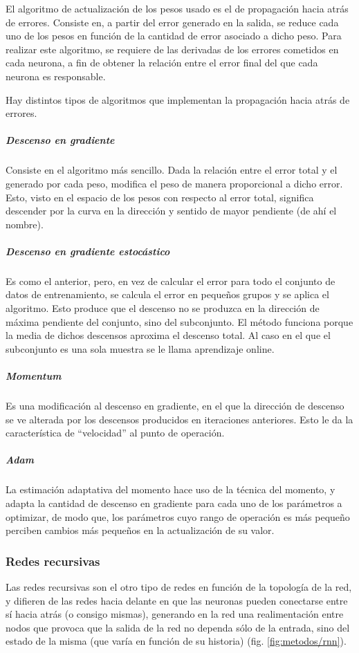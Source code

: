 El algoritmo de actualización de los pesos usado es el de propagación hacia atrás de errores. Consiste en, a partir del error generado en la salida, se reduce cada uno de los pesos en función de la cantidad de error asociado a dicho peso. Para realizar este algoritmo, se requiere de las derivadas de los errores cometidos en cada neurona, a fin de obtener la relación entre el error final del que cada neurona es responsable.

Hay distintos tipos de algoritmos \cite{gradient_descent} que implementan la propagación hacia atrás de errores.

\subparagraph{Descenso en gradiente}
Consiste en el algoritmo más sencillo. Dada la relación entre el error total y el generado por cada peso, modifica el peso de manera proporcional a dicho error. Esto, visto en el espacio de los pesos con respecto al error total, significa descender por la curva en la dirección y sentido de mayor pendiente (de ahí el nombre).
\subparagraph{Descenso en gradiente estocástico}
Es como el anterior, pero, en vez de calcular el error para todo el conjunto de datos de entrenamiento, se calcula el error en pequeños grupos y se aplica el algoritmo. Esto produce que el descenso no se produzca en la dirección de máxima pendiente del conjunto, sino del subconjunto. El método funciona porque la media de dichos descensos aproxima el descenso total. Al caso en el que el subconjunto es una sola muestra se le llama aprendizaje online.
\subparagraph{Momentum}
Es una modificación al descenso en gradiente, en el que la dirección de descenso se ve alterada por los descensos producidos en iteraciones anteriores. Esto le da la característica de ``velocidad'' al punto de operación.
\subparagraph{Adam}
La estimación adaptativa del momento hace uso de la técnica del momento, y adapta la cantidad de descenso en gradiente para cada uno de los parámetros a optimizar, de modo que, los parámetros cuyo rango de operación es más pequeño perciben cambios más pequeños en la actualización de su valor.

\subsubsection{Redes recursivas}
\label{subsubsec:metodos/recursivas}
Las redes recursivas \cite{karpathy} son el otro tipo de redes en función de la topología de la red, y difieren de las redes hacia delante en que las neuronas pueden conectarse entre sí hacia atrás (o consigo mismas), generando en la red una realimentación entre nodos que provoca que la salida de la red no dependa sólo de la entrada, sino del estado de la misma (que varía en función de su historia) (fig. \ref{fig:metodos/rnn}).

